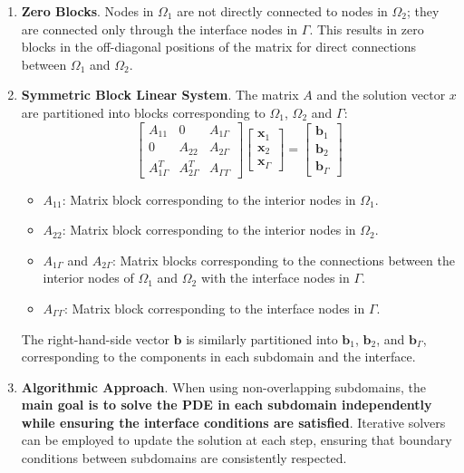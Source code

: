 \begin{enumerate}
    \newpage

    \item \textbf{Zero Blocks}. Nodes in $\Omega_{1}$ are not directly connected to nodes in $\Omega_{2}$; they are connected only through the interface nodes in $\Gamma$. This results in zero blocks in the off-diagonal positions of the matrix for direct connections between $\Omega_{1}$ and $\Omega_{2}$.
    
    \item \textbf{Symmetric Block Linear System}. The matrix $A$ and the solution vector $x$ are partitioned into blocks corresponding to $\Omega_{1}$, $\Omega_{2}$ and $\Gamma$:
    \begin{equation*}
        \begin{bmatrix}
            A_{11} & 0 & A_{1\Gamma} \\
            0 & A_{22} & A_{2\Gamma} \\
            A_{1\Gamma}^{T} & A_{2\Gamma}^{T} & A_{\Gamma\Gamma}
        \end{bmatrix}
        \begin{bmatrix}
            \mathbf{x}_{1} \\ \mathbf{x}_{2} \\ \mathbf{x}_{\Gamma}
        \end{bmatrix}
        =
        \begin{bmatrix}
            \mathbf{b}_{1} \\ \mathbf{b}_{2} \\ \mathbf{b}_{\Gamma}
        \end{bmatrix}
    \end{equation*}
    \begin{itemize}
        \item $A_{11}$: Matrix block corresponding to the interior nodes in $\Omega_{1}$.
        \item $A_{22}$: Matrix block corresponding to the interior nodes in $\Omega_{2}$.
        \item $A_{1\Gamma}$ and $A_{2\Gamma}$: Matrix blocks corresponding to the connections between the interior nodes of $\Omega_{1}$ and $\Omega_{2}$ with the interface nodes in $\Gamma$.
        \item $A_{\Gamma\Gamma}$: Matrix block corresponding to the interface nodes in $\Gamma$.
    \end{itemize}
    The right-hand-side vector $\mathbf{b}$ is similarly partitioned into $\mathbf{b}_{1}$, $\mathbf{b}_{2}$, and $\mathbf{b}_\Gamma$, corresponding to the components in each subdomain and the interface.

    \item \textbf{Algorithmic Approach}. When using non-overlapping subdomains, the \textbf{main goal is to solve the PDE in each subdomain independently while ensuring the interface conditions are satisfied}. Iterative solvers can be employed to update the solution at each step, ensuring that boundary conditions between subdomains are consistently respected.
\end{enumerate}
